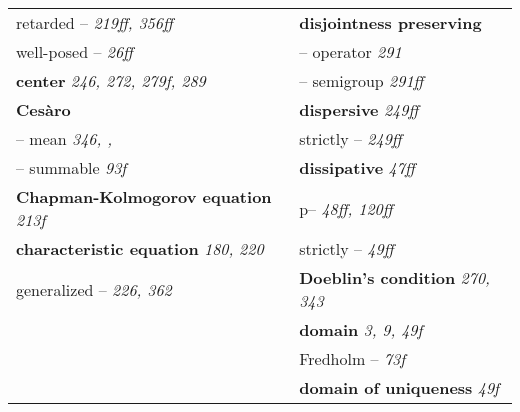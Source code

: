 \begin{longtable}{p{}p{}}
\quad retarded -- \textit{219ff, 356ff} & \textbf{disjointness preserving} \\
\quad well-posed -- \textit{26ff} & \quad -- operator \textit{291} \\
\textbf{center} \textit{246, 272, 279f, 289} & \quad -- semigroup \textit{291ff} \\
\textbf{Cesàro} & \textbf{dispersive} \textit{249ff} \\
\quad -- mean \textit{346, , } & \quad strictly -- \textit{249ff} \\
\quad -- summable \textit{93f} & \textbf{dissipative} \textit{47ff} \\
\textbf{Chapman-Kolmogorov equation} \textit{213f} & \quad p-- \textit{48ff, 120ff} \\
\textbf{characteristic equation} \textit{180, 220} & \quad strictly -- \textit{49ff} \\
\quad generalized -- \textit{226, 362} & \textbf{Doeblin's condition} \textit{270, 343} \\
& \textbf{domain} \textit{3, 9, 49f} \\
& \quad Fredholm -- \textit{73f} \\
& \textbf{domain of uniqueness} \textit{49f} \\


\end{longtable}
